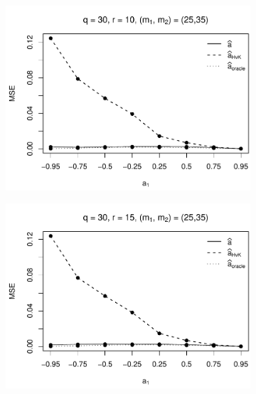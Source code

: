 \begin{figure}[p]
\begin{subfigure}[b]{0.45\textwidth}
\includegraphics[width=\textwidth]{Plots/Robustness/MSE_a1_T=500_slope=10_(q,K1,K2,M1,M2)=(30,2,10,25,35).pdf}
\end{subfigure}
\hspace{0.25cm}
\begin{subfigure}[b]{0.45\textwidth}
\includegraphics[width=\textwidth]{Plots/Robustness/MSE_a1_T=500_slope=10_(q,K1,K2,M1,M2)=(30,2,15,25,35).pdf}
\end{subfigure}


\end{figure}
